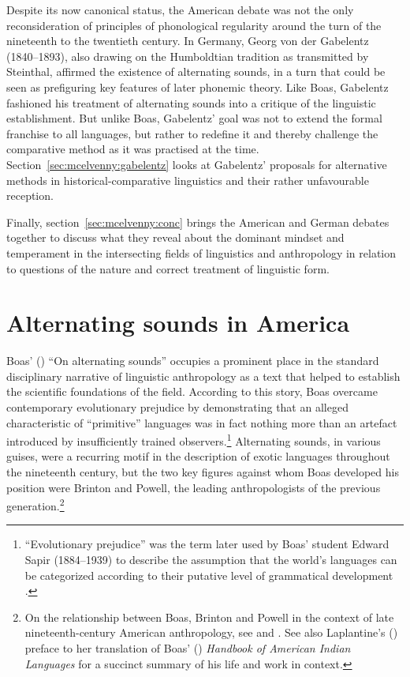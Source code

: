 \documentclass[output=paper]{langscibook}
\begin{document}
Despite its now canonical status, the American debate was not the only reconsideration of principles of phonological regularity around the turn of the nineteenth to the twentieth century. In Germany, Georg von der Gabelentz (1840–1893), also drawing on the Humboldtian tradition as transmitted by Steinthal, affirmed the existence of alternating sounds, in a turn that could be seen as prefiguring key features of later phonemic theory. Like Boas, Gabelentz fashioned his treatment of alternating sounds into a critique of the linguistic establishment. But unlike Boas, Gabelentz' goal was not to extend the formal franchise to all languages, but rather to redefine it and thereby challenge the comparative method as it was practised at the time. Section~\ref{sec:mcelvenny:gabelentz} looks at Gabelentz' proposals for alternative methods in historical-comparative linguistics and their rather unfavourable reception. 

Finally, section~\ref{sec:mcelvenny:conc} brings the American and German debates together to discuss what they reveal about the dominant mindset and temperament in the intersecting fields of linguistics and anthropology in relation to questions of the nature and correct treatment of linguistic form.

\section{Alternating sounds in America}
\label{sec:mcelvenny:america}

Boas' (\citeyear{Boas1889}) ``On alternating sounds'' occupies a prominent place in the standard disciplinary narrative of linguistic anthropology as a text that helped to establish the scientific foundations of the field. According to this story, Boas overcame contemporary evolutionary prejudice by demonstrating that an alleged characteristic of ``primitive'' languages was in fact nothing more than an artefact introduced by insufficiently trained observers.\footnote{``Evolutionary prejudice'' was the term later used by Boas' student Edward Sapir (1884–1939) to describe the assumption that the world's languages can be categorized according to their putative level of grammatical development \citep[see][130-132]{Sapir1921}.} Alternating sounds, in various guises, were a recurring motif in the description of exotic languages throughout the nineteenth century, but the two key figures against whom Boas developed his position were Brinton and Powell, the leading anthropologists of the previous generation.\footnote{On the relationship between Boas, Brinton and Powell in the context of late nineteenth-century American anthropology, see \citet{Darnell1988} and \citet{Darnell1998}. See also Laplantine's (\citeyear{Laplantine2018}) preface to her translation of Boas' (\citeyear{Boas1911}) \emph{Handbook of American Indian Languages} for a succinct summary of his life and work in context.}
\end{document}
